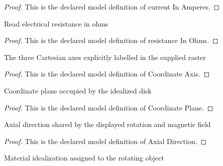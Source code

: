 \begin{proof}
  This is the declared model definition of current In Amperes.
\end{proof}
\begin{definition}
  \label{def:physics:phyx-mini-0920:phyxminiproblems-problemphyxmini0920-resistanceinohms}
  Read electrical resistance in ohms
\end{definition}
\begin{proof}
  This is the declared model definition of resistance In Ohms.
\end{proof}
\begin{definition}
  \label{def:physics:phyx-mini-0920:phyxminiproblems-problemphyxmini0920-coordinateaxis}
  The three Cartesian axes explicitly labelled in the supplied raster
\end{definition}
\begin{proof}
  This is the declared model definition of Coordinate Axis.
\end{proof}
\begin{definition}
  \label{def:physics:phyx-mini-0920:phyxminiproblems-problemphyxmini0920-coordinateplane}
  Coordinate plane occupied by the idealized disk
\end{definition}
\begin{proof}
  This is the declared model definition of Coordinate Plane.
\end{proof}
\begin{definition}
  \label{def:physics:phyx-mini-0920:phyxminiproblems-problemphyxmini0920-axialdirection}
  Axial direction shared by the displayed rotation and magnetic field
\end{definition}
\begin{proof}
  This is the declared model definition of Axial Direction.
\end{proof}
\begin{definition}
  \label{def:physics:phyx-mini-0920:phyxminiproblems-problemphyxmini0920-diskmaterialmodel}
  Material idealization assigned to the rotating object
\end{definition}
